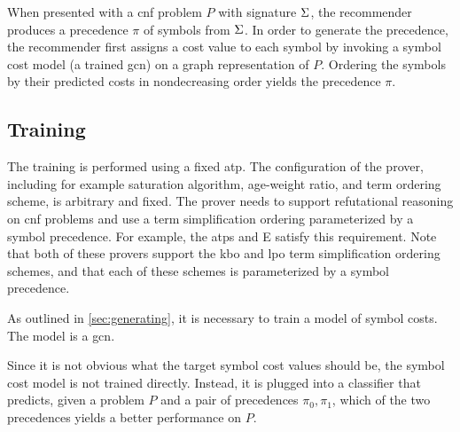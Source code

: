When presented with a \gls{cnf} problem $P$ with signature $\operatorname{\Sigma}$,
the recommender produces a precedence $\pi$ of symbols from $\operatorname{\Sigma}$.
In order to generate the precedence,
the recommender first assigns a cost value to each symbol
by invoking a symbol cost model (a trained \gls{gcn}) on a graph representation of $P$.
Ordering the symbols by their predicted costs in nondecreasing order yields the precedence $\pi$.

\subsection{Training}

The training is performed using a fixed \acrlong{atp}.
The configuration of the prover,
including for example saturation algorithm, age-weight ratio, and term ordering scheme,
is arbitrary and fixed.
The prover needs to support refutational reasoning on \gls{cnf} problems
and use a term simplification ordering parameterized by a symbol precedence.
For example, the \glspl{atp} \vampire{} and E satisfy this requirement.
Note that both of these provers support the \gls{kbo} and \gls{lpo} term simplification ordering schemes,
and that each of these schemes is parameterized by a symbol precedence.

As outlined in \cref{sec:generating},
it is necessary to train a model of symbol costs.
The model is a \gls{gcn}.


Since it is not obvious what the target symbol cost values should be,
the symbol cost model is not trained directly.
Instead, it is plugged into a classifier that predicts,
given a problem $P$ and a pair of precedences $\pi_0, \pi_1$,
which of the two precedences yields a better performance on $P$.

